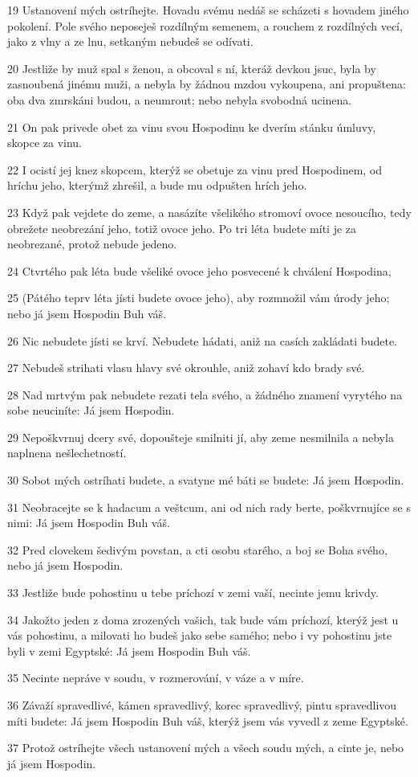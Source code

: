 \par 19 Ustanovení mých ostríhejte. Hovadu svému nedáš se scházeti s hovadem jiného pokolení. Pole svého neposeješ rozdílným semenem, a rouchem z rozdílných vecí, jako z vlny a ze lnu, setkaným nebudeš se odívati.
\par 20 Jestliže by muž spal s ženou, a obcoval s ní, kteráž devkou jsuc, byla by zasnoubená jinému muži, a nebyla by žádnou mzdou vykoupena, ani propuštena: oba dva zmrskáni budou, a neumrout; nebo nebyla svobodná ucinena.
\par 21 On pak privede obet za vinu svou Hospodinu ke dverím stánku úmluvy, skopce za vinu.
\par 22 I ocistí jej knez skopcem, kterýž se obetuje za vinu pred Hospodinem, od hríchu jeho, kterýmž zhrešil, a bude mu odpušten hrích jeho.
\par 23 Když pak vejdete do zeme, a nasázíte všelikého stromoví ovoce nesoucího, tedy obrežete neobrezání jeho, totiž ovoce jeho. Po tri léta budete míti je za neobrezané, protož nebude jedeno.
\par 24 Ctvrtého pak léta bude všeliké ovoce jeho posvecené k chválení Hospodina,
\par 25 (Pátého teprv léta jísti budete ovoce jeho), aby rozmnožil vám úrody jeho; nebo já jsem Hospodin Buh váš.
\par 26 Nic nebudete jísti se krví. Nebudete hádati, aniž na casích zakládati budete.
\par 27 Nebudeš strihati vlasu hlavy své okrouhle, aniž zohaví kdo brady své.
\par 28 Nad mrtvým pak nebudete rezati tela svého, a žádného znamení vyrytého na sobe neuciníte: Já jsem Hospodin.
\par 29 Nepoškvrnuj dcery své, dopoušteje smilniti jí, aby zeme nesmilnila a nebyla naplnena nešlechetností.
\par 30 Sobot mých ostríhati budete, a svatyne mé báti se budete: Já jsem Hospodin.
\par 31 Neobracejte se k hadacum a veštcum, ani od nich rady berte, poškvrnujíce se s nimi: Já jsem Hospodin Buh váš.
\par 32 Pred clovekem šedivým povstan, a cti osobu starého, a boj se Boha svého, nebo já jsem Hospodin.
\par 33 Jestliže bude pohostinu u tebe príchozí v zemi vaší, necinte jemu krivdy.
\par 34 Jakožto jeden z doma zrozených vašich, tak bude vám príchozí, kterýž jest u vás pohostinu, a milovati ho budeš jako sebe samého; nebo i vy pohostinu jste byli v zemi Egyptské: Já jsem Hospodin Buh váš.
\par 35 Necinte nepráve v soudu, v rozmerování, v váze a v míre.
\par 36 Závaží spravedlivé, kámen spravedlivý, korec spravedlivý, pintu spravedlivou míti budete: Já jsem Hospodin Buh váš, kterýž jsem vás vyvedl z zeme Egyptské.
\par 37 Protož ostríhejte všech ustanovení mých a všech soudu mých, a cinte je, nebo já jsem Hospodin.

